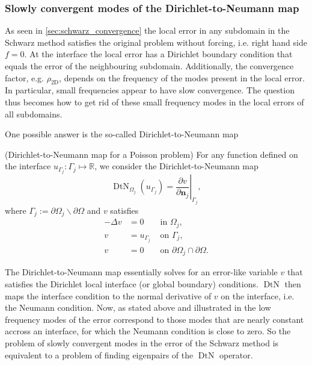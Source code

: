 \subsubsection{Slowly convergent modes of the Dirichlet-to-Neumann map}
As seen in \cref{sec:schwarz_convergence} the local error in any subdomain in the Schwarz method satisfies the original problem without forcing, i.e. right hand side $f = 0$. At the interface the local error has a Dirichlet boundary condition that equals the error of the neighbouring subdomain. Additionally, the convergence factor, e.g. $\rho_{\text{2D}}$, depends on the frequency of the modes present in the local error. In particular, small frequencies appear to have slow convergence. The question thus becomes how to get rid of these small frequency modes in the local errors of all subdomains.

One possible answer is the so-called Dirichlet-to-Neumann map \cite[Definition 5.1]{schwarz_methods_Dolean_2015}
\begin{definition}
    (Dirichlet-to-Neumann map for a Poisson problem) For any function defined on the interface $u_{\Gamma_j}: \Gamma_j \mapsto \mathbb{R}$, we consider the Dirichlet-to-Neumann map
    \[
        \operatorname{DtN}_{\Omega_j}\left(u_{\Gamma_j}\right)=\left.\frac{\partial v}{\partial \mathbf{n}_j}\right|_{\Gamma_j},
    \]
    where $\Gamma_j:=\partial \Omega_j \backslash \partial \Omega$ and $v$ satisfies
    \begin{equation}
        \begin{array}{ccc}
            -\Delta v & =0            & \text { in } \Omega_j,                                \\
            v         & =u_{\Gamma_j} & \text { on } \Gamma_j,                                \\
            v         & =0            & \text { on } \partial \Omega_j \cap \partial \Omega .
        \end{array}
        \label{eq:dirichlet_to_neumann_map_subproblem}
    \end{equation}
    \label{def:dirichlet_to_neumann_map}
\end{definition}

The Dirichlet-to-Neumann map essentially solves for an error-like variable $v$ that satisfies the Dirichlet local interface (or global boundary) conditions. $\operatorname{DtN}$ then maps the interface condition to the normal derivative of $v$ on the interface, i.e. the Neumann condition. Now, as stated above and illustrated in \cite[Figure 5.2]{schwarz_methods_Dolean_2015} the low frequency modes of the error correspond to those modes that are nearly constant accross an interface, for which the Neumann condition is close to zero. So the problem of slowly convergent modes in the error of the Schwarz method is equivalent to a problem of finding eigenpairs of the $\operatorname{DtN}$ operator.

